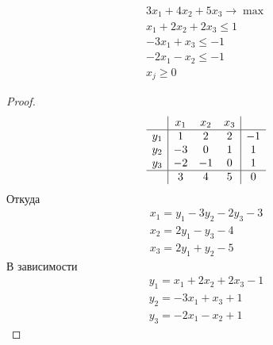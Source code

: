 \vskip 0.6in



\begin{prob}
\begin{gather*}
	3 x_{1}+4 x_{2}+5 x_{3} \to \max \\
	x_{1}+2 x_{2}+2 x_{3} \leqslant 1 \\
	-3 x_{1}+x_{3} \leqslant -1 \\
	-2 x_{1}-x_{2} \leqslant -1 \\
	x_{j} \geqslant 0
\end{gather*}
\end{prob}
\begin{proof}
	\begin{gather*}
	\begin{array}{c|ccc|c} 
		& x_{1} & x_{2} & x_{3} & \\
		\hline 
		y_{1} & 1 & 2 & 2 & -1\\
		y_{2} & -3 & 0 & 1 & 1 \\
		y_{3} & -2 & -1 & 0 & 1\\
		\hline 
		& 3 & 4 & 5 & 0
	\end{array}
	\end{gather*}
	Откуда
	\begin{gather*}
		x_{1} = y_{1} - 3y_{2} - 2y_{3} - 3\\
		x_{2} = 2y_{1} - y_{3} - 4\\
		x_{3} = 2y_{1} + y_{2} - 5
	\end{gather*}
	В зависимости
	\begin{gather*}
		y_{1} = x_{1} + 2x_{2} + 2x_{3} - 1\\
		y_{2} = -3x_{1} + x_{3} + 1\\
		y_{3} = -2x_{1} - x_{2} + 1
	\end{gather*}
	

\end{proof}
